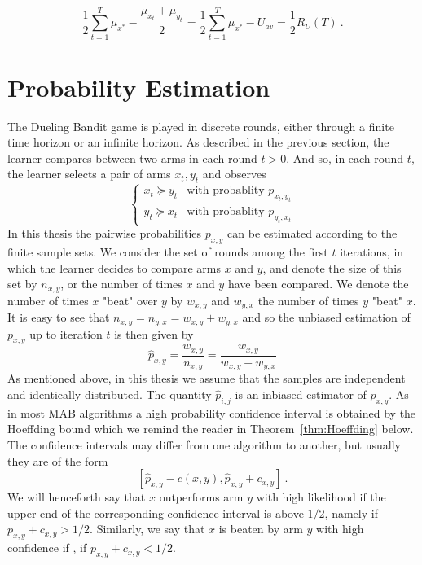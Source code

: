 \documentclass[MSc,beforeExam]{iitcsthesis}
\begin{document}
$$
\frac{1}{2} \sum_{t=1}^T \mu_{x^*} -\frac{
	\mu_{x_t}+\mu_{y_t}}{2} =
\frac{1}{2} \sum_{t=1}^T \mu_{x^*}- U_{av} = \frac{1}{2}R_U(T)\ .$$

	\section{Probability Estimation}
		The Dueling Bandit game is played in discrete rounds, either through a finite time horizon or an infinite horizon. 
		 As described in the previous section, the learner compares between two arms in each round $t > 0$. 
		 And so, in each round $t$, the learner selects a pair of arms $x_t,y_t$ and observes
	\begin{equation}
		\begin{cases}
    		x_t \succeq y_t & \text{with probablity } p_{x_t,y_t} 
       	\\
    		y_t \succeq x_t & \text{with probablity } p_{y_t,x_t}
	\end{cases}
	\end{equation}
	In this thesis the pairwise probabilities $p_{x,y}$ can be estimated according to the finite sample sets.
	We consider the set of rounds among the first $t$ iterations, in which the learner decides to compare arms $x$ and $y$, and denote the size of this set by $n_{x,y}$, or the number of times $x$ and $y$ have been compared.
	We denote the number of times $x$ "beat" over $y$ by $w_{x,y}$ and $w_{y,x}$ the number of times $y$ "beat" $x$.
	It is easy to see that $n_{x,y} = n_{y,x} = w_{x,y}+w_{y,x}$ and so the unbiased estimation of $p_{x,y}$ up to iteration $t$ is then given by
	\begin{equation}\label{eq:est_pxy}
		\hat{p}_{x, y} = \frac{w_{x,y}}{n_{x,y}} = 
		\frac{w_{x,y}}{w_{x,y}+w_{y,x}}
	\end{equation}
	As mentioned above, in this thesis we assume that the samples are independent and identically distributed.
	The quantity  $\hat{p}_{i,j}$  is an inbiased estimator of $p_{x,y}$.
	As in most MAB algorithms a high probability confidence interval is obtained by the Hoeffding bound which we
	remind the reader in Theorem~\ref{thm:Hoeffding} below.
	The confidence intervals may differ from one algorithm to another, but usually they are of the form $$[\hat p_{x,y}- c(x,y), \hat p_{x,y}+c_{x,y} ]\ .$$
	We will henceforth say that $x$ outperforms arm $y$ with high likelihood if the upper end of the corresponding
	confidence interval is above $1/2$, namely if  $p_{x,y} + c_{x,y} > 1/2$.  Similarly, we say that  $x$ is beaten by arm $y$ with high confidence if , if $p_{x,y} + c_{x,y} < 1/2$.
\end{document}
